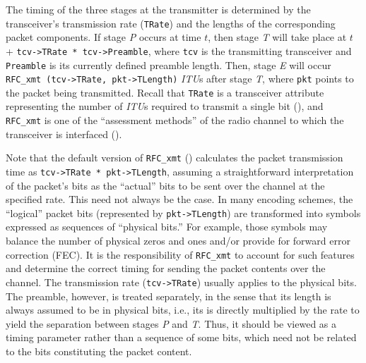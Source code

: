 \noindent
The timing of the three stages at the transmitter is
determined by the transceiver's transmission rate ({\tt TRate}) and the lengths
of the corresponding packet components.
If stage {\em P\/} occurs at time $t$, then stage {\em T\/} will take place
at $t$ + {\tt tcv->TRate * tcv->Preamble}, where {\tt tcv} is the transmitting
transceiver and {\tt Preamble} is its currently defined preamble length.
Then, stage {\em E\/} will occur {\tt RFC\_xmt (tcv->TRate, pkt->TLength)}
{\em ITU\/}s after stage {\em T}, where
{\tt pkt} points to the packet being transmitted.
Recall that {\tt TRate} is a transceiver attribute representing the number of
{\em ITU\/}s required to transmit a single bit (), and
{\tt RFC\_xmt} is one of the ``assessment methods'' of the radio channel to
which the transceiver is interfaced ().

Note that the default version of {\tt RFC\_xmt} ()
calculates the packet transmission time as {\tt tcv->TRate * pkt->TLength},
assuming a straightforward interpretation of the packet's bits as the
``actual'' bits to be sent over the channel at the specified rate.
This need not always be the case.
In many encoding schemes, the ``logical''
packet bits (represented by {\tt pkt->TLength})
are transformed into symbols expressed as sequences of ``physical bits.''
For example, those symbols may balance the number of physical zeros and ones
and/or provide for forward error correction (FEC).
It is the responsibility of {\tt RFC\_xmt} to account for such features and
determine the correct timing for sending the packet contents over the channel.
The transmission rate ({\tt tcv->TRate}) usually applies to the physical
bits.
The preamble, however, is treated separately, in the sense that its length
is always
assumed to be in physical bits, i.e., its is directly multiplied by the
rate to yield the separation between stages {\em P\/} and {\em T}.
Thus, it should be viewed as a timing parameter rather than a sequence of
some bits, which need not be related to the bits constituting the packet
content.

